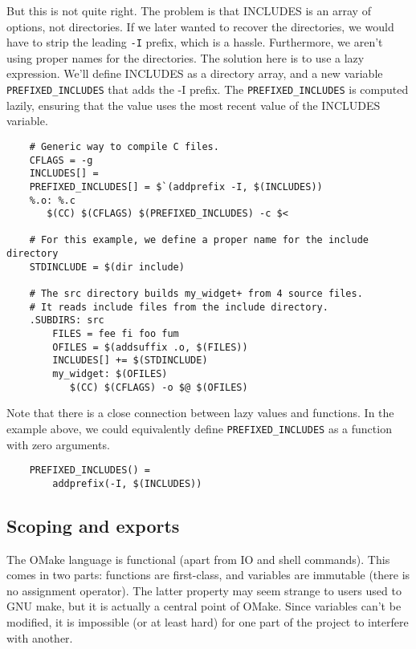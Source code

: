 But this is not quite right.  The problem is that INCLUDES is an array of options, not directories.
If we later wanted to recover the directories, we would have to strip the leading \verb+-I+ prefix,
which is a hassle.  Furthermore, we aren't using proper names for the directories.  The solution
here is to use a lazy expression.  We'll define INCLUDES as a directory array, and a new variable
\verb+PREFIXED_INCLUDES+ that adds the -I prefix.  The \verb+PREFIXED_INCLUDES+ is computed lazily,
ensuring that the value uses the most recent value of the INCLUDES variable.

\begin{verbatim}
    # Generic way to compile C files.
    CFLAGS = -g
    INCLUDES[] =
    PREFIXED_INCLUDES[] = $`(addprefix -I, $(INCLUDES))
    %.o: %.c
       $(CC) $(CFLAGS) $(PREFIXED_INCLUDES) -c $<

    # For this example, we define a proper name for the include directory
    STDINCLUDE = $(dir include)

    # The src directory builds my_widget+ from 4 source files.
    # It reads include files from the include directory.
    .SUBDIRS: src
        FILES = fee fi foo fum
        OFILES = $(addsuffix .o, $(FILES))
        INCLUDES[] += $(STDINCLUDE)
        my_widget: $(OFILES)
           $(CC) $(CFLAGS) -o $@ $(OFILES)
\end{verbatim}

Note that there is a close connection between lazy values and functions.  In the example above, we
could equivalently define \verb+PREFIXED_INCLUDES+ as a function with zero arguments.

\begin{verbatim}
    PREFIXED_INCLUDES() =
        addprefix(-I, $(INCLUDES))
\end{verbatim}

\subsection{Scoping and exports}

The OMake language is functional (apart from IO and shell commands).  This comes in two parts:
functions are first-class, and variables are immutable (there is no assignment operator).  The
latter property may seem strange to users used to GNU make, but it is actually a central point of
OMake.  Since variables can't be modified, it is impossible (or at least hard) for one part of the
project to interfere with another.

